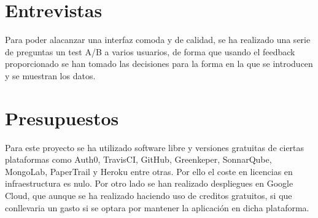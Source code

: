 \section {Entrevistas}
Para poder alacanzar una interfaz comoda y de calidad, se ha realizado una serie de preguntas un test A/B a varios usuarios, de forma que usando el feedback proporcionado se han tomado las decisiones para la forma en la que se introducen y se muestran los datos.

\section {Presupuestos}

Para este proyecto se ha utilizado software libre y versiones gratuitas de ciertas plataformas como Auth0, TravisCI, GitHub, Greenkeper, SonnarQube, MongoLab, PaperTrail y Heroku entre otras. Por ello el coste en licencias en infraestructura es nulo. Por otro lado se han realizado despliegues en Google Cloud, que aunque se ha realizado haciendo uso de creditos gratuitos, si que conllevaria un gasto si se optara por mantener la aplicación en dicha plataforma.




